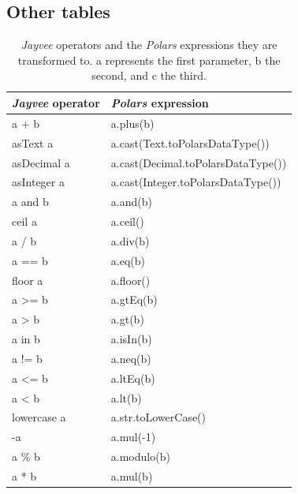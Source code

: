 \subsection{Other tables}
\begin{table}[H]
	\caption{\emph{Jayvee} operators and the \emph{Polars} expressions they are transformed to.
		a represents the first parameter, b the second, and c the third.}
	\label{tab:impl:expressions}
	\begin{center}
		\begin{tabular}{|l|l|}
			\hline
			\emph{Jayvee} operator & \emph{Polars} expression           \\
			\hline
			\hline
			a + b                  & a.plus(b)                          \\
			asText a               & a.cast(Text.toPolarsDataType())    \\
			asDecimal a            & a.cast(Decimal.toPolarsDataType()) \\
			asInteger a            & a.cast(Integer.toPolarsDataType()) \\
			a and b                & a.and(b)                           \\
			ceil a                 & a.ceil()                           \\
			a / b                  & a.div(b)                           \\
			a == b                 & a.eq(b)                            \\
			floor a                & a.floor()                          \\
			a >= b                 & a.gtEq(b)                          \\
			a > b                  & a.gt(b)                            \\
			a in b                 & a.isIn(b)                          \\
			a != b                 & a.neq(b)                           \\
			a <= b                 & a.ltEq(b)                          \\
			a < b                  & a.lt(b)                            \\
			lowercase a            & a.str.toLowerCase()                \\
			-a                     & a.mul(-1)                          \\
			a \% b                 & a.modulo(b)                        \\
			a * b                  & a.mul(b)                           \\

\end{tabular}
\end{center}
\end{table}
